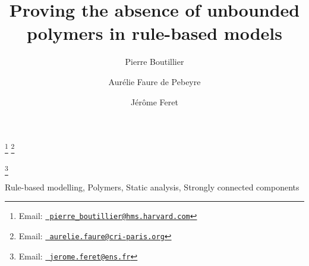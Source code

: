 \documentclass{entcs}
\begin{document}
\begin{frontmatter}
  \title{Proving the absence of unbounded polymers in rule-based models} \author{Pierre Boutillier}
  \address{Harvard Medical School, \\ Department of Systems Biology, Boston, MA 02115, USA}
  \author{Aur\'elie Faure de Pebeyre}
\address{Centre de recherche interdisciplinaire, 75004 Paris, France}
\address{INRIA, \\ Centre de recherche INRIA de Paris, 75 012 Paris, France}
\address{D\'{e}partement d'informatique de l'\'{E}cole normale sup\'{e}rieure,\\
\'Ecole normale sup\'erieure, CNRS, PSL Research University,
75 005 Paris, France}
  \author{J\'{e}r\^{o}me Feret}
  \address{INRIA, \\ Centre de recherche INRIA de Paris, 75 012 Paris, France}
  \address{D\'{e}partement d'informatique de l'\'{E}cole normale sup\'{e}rieure,\\
  \'Ecole normale sup\'erieure, CNRS, PSL Research University,
  75 005 Paris, France}
\thanks[pbemail]{Email:
    \href{mailto:pierre\_boutillier@hms.harvard.com} {\texttt{\normalshape
        pierre\_boutillier@hms.harvard.com}}}
\thanks[afemail]{Email:
            \href{mailto:aurelie.faure@cri-paris.org} {\texttt{\normalshape
        aurelie.faure@cri-paris.org}}}

\thanks[jfemail]{Email:
    \href{mailto:jerome.feret@ens.fr} {\texttt{\normalshape
        jerome.feret@ens.fr}}}
\begin{abstract}

\end{abstract}
\begin{keyword}
  Rule-based modelling,
Polymers,
Static analysis,
Strongly connected components
\end{keyword}
\end{frontmatter}
\end{document}
